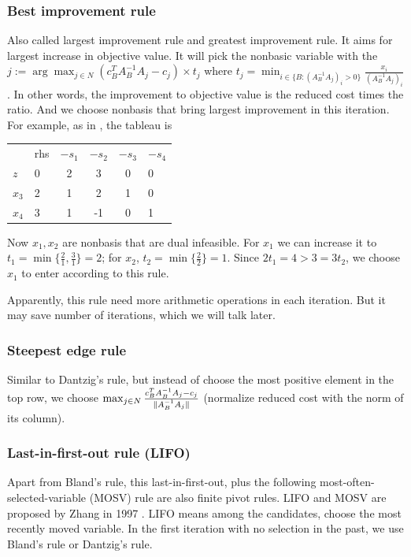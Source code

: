 \documentclass[11pt]{article}
\begin{document}
\subsubsection{Best improvement rule}

Also called largest improvement rule and greatest improvement rule. It aims for largest increase in objective value. It will pick the nonbasic variable with the $j := \arg \max_{j\in N}(c_B^T A_B^{-1} A_j - c_j)\times t_j$ where $t_j = \min_{i \in \{B:(A_B^{-1}A_j)_{i} >0\}} \frac{x_i}{(A_B^{-1}A_j)_{i}}$. In other words, the improvement to objective value is the reduced cost times the ratio. And we choose nonbasis that bring largest improvement in this iteration. For example, as in \cite{largest}, the tableau is
\begin{table}[h]
\centering
\begin{tabular}{cccccc}
                        & rhs                    & $-s_1$ & $-s_2$ & $-s_3$ & $-s_4$                    \\ \cline{2-6} 
\multicolumn{1}{l|}{$z$}  & \multicolumn{1}{l|}{0} & 2   & 3   & 0   & \multicolumn{1}{l|}{0} \\ \cline{2-6} 
\multicolumn{1}{l|}{$x_3$} & \multicolumn{1}{l|}{2} & 1   & 2   & 1   & \multicolumn{1}{l|}{0} \\
\multicolumn{1}{l|}{$x_4$} & \multicolumn{1}{l|}{3} & 1   & -1  & 0   & \multicolumn{1}{l|}{1} \\ \cline{2-6} 
\end{tabular}
\end{table}

Now $x_1, x_2$ are nonbasis that are dual infeasible. For $x_1$ we can increase it to $t_1 = \min \{\frac{2}{1}, \frac{3}{1}\} = 2$; for $x_2$, $t_2 = \min \{\frac{2}{2}\} = 1$. Since $2t_1 = 4 > 3 = 3t_2$, we choose $x_1$ to enter according to this rule.

Apparently, this rule need more arithmetic operations in each iteration. But it may save number of iterations, which we will talk later.

\subsubsection{Steepest edge rule}
Similar to Dantzig's rule, but instead of choose the most positive element in the top row, we choose $\max_{j \in N} \frac{c_B^TA_B^{-1}A_j - c_j}{\lVert A_B^{-1}A_j\rVert}$ (normalize reduced cost with the norm of its column).

\subsubsection{Last-in-first-out rule (LIFO)}
Apart from Bland's rule, this last-in-first-out, plus the following most-often-selected-variable (MOSV) rule are also finite pivot rules. LIFO and MOSV are proposed by Zhang in 1997 \cite{zhang1999new}. LIFO means among the candidates, choose the most recently moved variable. In the first iteration with no selection in the past, we use Bland's rule or Dantzig's rule.
\end{document}
